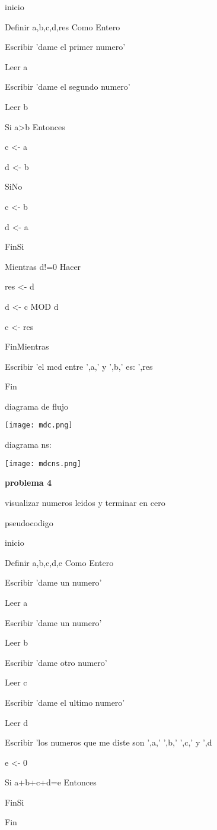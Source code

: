 \documentclass[10pt,a4paper]{article}
\begin{document}
\begin{multicols}{2}
	inicio
	
	Definir a,b,c,d,res Como Entero

	Escribir 'dame el primer numero'

	Leer a

	Escribir 'dame el segundo numero'

	Leer b

	Si a>b Entonces

		c <- a

		d <- b

	SiNo

		c <- b

		d <- a

	FinSi

	Mientras d!=0 Hacer

		res <- d

		d <- c MOD d

		c <- res

	FinMientras
	
	Escribir 'el mcd entre ',a,' y ',b,' es: ',res

Fin

diagrama de flujo

\texttt{[image: mdc.png]} 

diagrama ns:

\texttt{[image: mdcns.png]}

\begin{center}
\textbf{problema 4}
\end{center} 

visualizar numeros leidos y terminar en cero

pseudocodigo 

inicio

Definir a,b,c,d,e Como Entero

	Escribir 'dame un numero'

	Leer a

	Escribir 'dame un numero'

	Leer b

	Escribir 'dame otro numero'

	Leer c

	Escribir 'dame el ultimo numero'

	Leer d

	Escribir 'los numeros que me diste son ',a,' ',b,' ',c,' y ',d

	e <- 0

	Si a+b+c+d=e Entonces

	FinSi

Fin


\end{multicols}
\end{document}
